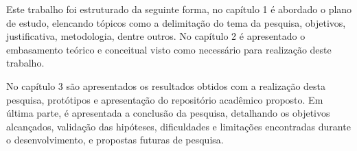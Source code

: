 Este trabalho foi estruturado da seguinte forma, no capítulo 1
é abordado o plano de estudo, elencando tópicos como a delimitação
do tema da pesquisa, objetivos, justificativa, metodologia, dentre outros.
No capítulo 2 é apresentado o embasamento teórico e conceitual
visto como necessário para realização deste trabalho.

No capítulo 3 são apresentados os resultados obtidos com a realização desta
pesquisa, protótipos e apresentação do repositório acadêmico proposto.
Em última parte, é apresentada a conclusão da pesquisa,
detalhando os objetivos alcançados, validação das hipóteses, dificuldades
e limitações encontradas durante o desenvolvimento, e propostas futuras
de pesquisa.